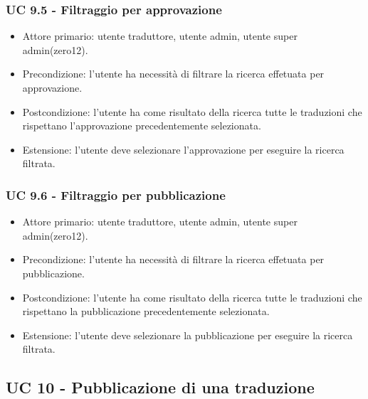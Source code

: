     \subsubsection{UC 9.5 - Filtraggio per approvazione}
        \begin{itemize}
            \item Attore primario: utente traduttore, utente admin, utente super admin(zero12).
            \item Precondizione: l'utente ha necessità di filtrare la ricerca effetuata per approvazione.
            \item Postcondizione: l'utente ha come risultato della ricerca tutte le traduzioni che rispettano l'approvazione precedentemente selezionata. 
            \item Estensione: l'utente deve selezionare l'approvazione per eseguire la ricerca filtrata.
        \end{itemize}  
    \subsubsection{UC 9.6 - Filtraggio per pubblicazione}
        \begin{itemize}
            \item Attore primario: utente traduttore, utente admin, utente super admin(zero12).
            \item Precondizione: l'utente ha necessità di filtrare la ricerca effetuata per pubblicazione.
            \item Postcondizione: l'utente ha come risultato della ricerca tutte le traduzioni che rispettano la pubblicazione precedentemente selezionata. 
            \item Estensione: l'utente deve selezionare la pubblicazione per eseguire la ricerca filtrata.
        \end{itemize} 
\subsection{UC 10 - Pubblicazione di una traduzione} %
